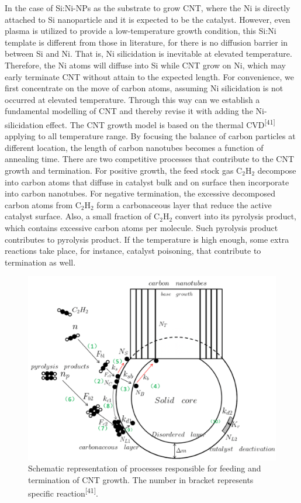 In the case of Si:Ni-NPs as the substrate to grow CNT, where the Ni is directly attached to Si nanoparticle and it is expected to be the catalyst. However, even plasma is utilized to provide a low-temperature growth condition, this Si:Ni template is different from those in literature, for there is no diffusion barrier in between Si and Ni. That is, Ni silicidation is inevitable at elevated temperature. Therefore,  the Ni atoms will diffuse into Si while CNT grow on Ni, which may early terminate CNT without attain to the expected length.  
For convenience, we first concentrate on the move of carbon atoms, assuming Ni silicidation is not occurred at elevated temperature. Through this way can we establish a fundamental modelling of CNT and thereby revise it with adding the Ni-silicidation effect. 
The CNT growth model is  based on the thermal CVD\textsuperscript{[41]} applying to all temperature range.  By focusing the balance of carbon particles at different location, the length of carbon nanotubes becomes a function of annealing time. There are two competitive processes that contribute to the CNT growth and termination. For positive growth, the feed stock gas $\mathrm{C_{2}H_{2}}$ decompose into carbon atoms that diﬀuse in catalyst bulk and on surface then incorporate into carbon nanotubes. For negative termination, the excessive decomposed carbon atoms from $\mathrm{C_{2}H_{2}}$ form a carbonaceous layer that reduce the active catalyst surface. Also, a small fraction of $\mathrm{C_{2}H_{2}}$ convert into its pyrolysis product, which contains excessive carbon atoms per molecule. Such pyrolysis product contributes to pyrolysis product. If the temperature is high enough, some extra reactions take place, for instance, catalyst poisoning, that contribute to termination as well. 
\begin{figure}[H]
\centering
\includegraphics[width=12cm]{src/fig/fig37.png}
\caption{Schematic representation of processes responsible for feeding and termination of CNT growth. The number in bracket represents specific reaction\textsuperscript{[41]}.}
\end{figure}
